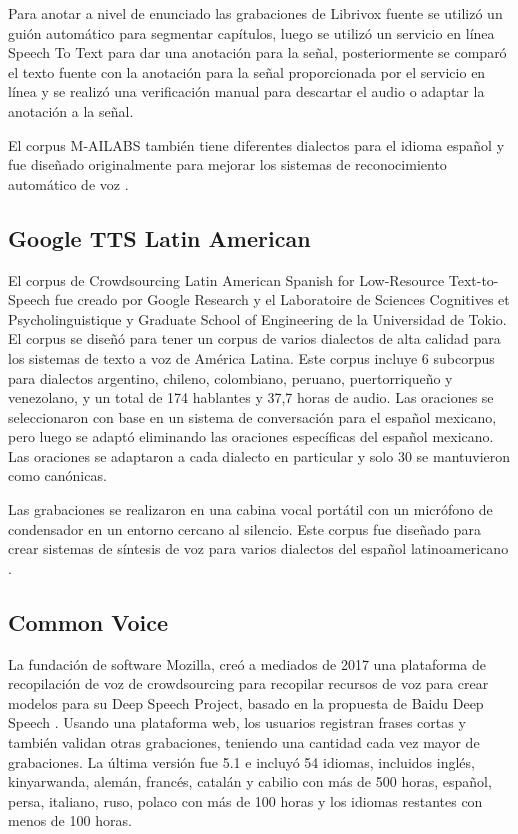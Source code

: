 \documentclass[a4paper,12pt,twoside]{report}
\begin{document}
Para anotar a nivel de enunciado las grabaciones de Librivox fuente se utilizó un guión automático para segmentar capítulos, luego se utilizó un servicio en línea Speech To Text para dar una anotación para la señal, posteriormente se comparó el texto fuente con la anotación para la señal proporcionada por el servicio en línea y se realizó una verificación manual para descartar el audio o adaptar la anotación a la señal.

El corpus M-AILABS también tiene diferentes dialectos para el idioma español y fue diseñado originalmente para mejorar los sistemas de reconocimiento automático de voz \cite{M-AILABS}.

\subsection{Google TTS Latin American}

El corpus de Crowdsourcing Latin American Spanish for Low-Resource Text-to-Speech fue creado por Google Research y el Laboratoire de Sciences Cognitives et Psycholinguistique y Graduate School of Engineering de la Universidad de Tokio. El corpus se diseñó para tener un corpus de varios dialectos de alta calidad para los sistemas de texto a voz de América Latina. Este corpus incluye 6 subcorpus para dialectos argentino, chileno, colombiano, peruano, puertorriqueño y venezolano, y un total de 174 hablantes y 37,7 horas de audio. Las oraciones se seleccionaron con base en un sistema de conversación para el español mexicano, pero luego se adaptó eliminando las oraciones específicas del español mexicano. Las oraciones se adaptaron a cada dialecto en particular y solo 30 se mantuvieron como canónicas.

Las grabaciones se realizaron en una cabina vocal portátil con un micrófono de condensador en un entorno cercano al silencio. Este corpus fue diseñado para crear sistemas de síntesis de voz para varios dialectos del español latinoamericano \cite{googleTTSLatinAmericanSpanishCorpus}.

\subsection{Common Voice}

La fundación de software Mozilla, creó a mediados de 2017 una plataforma de recopilación de voz de crowdsourcing para recopilar recursos de voz para crear modelos para su Deep Speech Project, basado en la propuesta de Baidu Deep Speech \cite{deepspeeh}. Usando una plataforma web, los usuarios registran frases cortas y también validan otras grabaciones, teniendo una cantidad cada vez mayor de grabaciones. La última versión fue 5.1 e incluyó 54 idiomas, incluidos inglés, kinyarwanda, alemán, francés, catalán y cabilio con más de 500 horas, español, persa, italiano, ruso, polaco con más de 100 horas y los idiomas restantes con menos de 100 horas.
\end{document}
